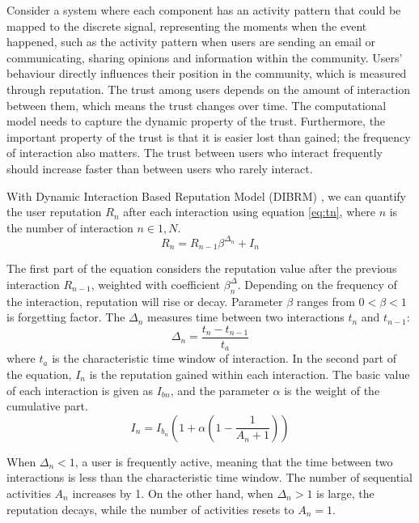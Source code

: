 Consider a system where each component has an activity pattern that could be mapped to the discrete signal, representing the moments when the event happened, such as the activity pattern when users are sending an email or communicating, sharing opinions and information within the community. Users' behaviour directly influences their position in the community, which is measured through reputation. The trust among users depends on the amount of interaction between them, which means the trust changes over time. The computational model needs to capture the dynamic property of the trust. Furthermore, the important property of the trust is that it is easier lost than gained; the frequency of interaction also matters. The trust between users who interact frequently should increase faster than between users who rarely interact. 

With Dynamic Interaction Based Reputation Model (DIBRM) \cite{melnikov2018toward}, we can quantify the user reputation $R_n$ after each interaction using equation \ref{eq:tn}, where $n$ is the number of interaction $n\in{1, N}$.
\begin{equation}\label{eq:tn}
R_{n}=R_{n-1} \beta^{\Delta_{n}} + I_{n}
\end{equation}

The first part of the equation considers the reputation value after the previous interaction $R_{n-1}$, weighted with coefficient $\beta^\Delta_{n}$. Depending on the frequency of the interaction, reputation will rise or decay. Parameter $\beta$ ranges from $0<\beta < 1$ is forgetting factor. The $\Delta_n$ measures time between two interactions $t_n$ and $t_{n-1}$: 
\begin{equation}\label{eq:deltan}
\Delta_{n}=\frac{t_{n}-t_{n-1}}{t_{a}}
\end{equation}
where $t_a$ is the characteristic time window of interaction. In the second part of the equation, $I_n$ is the reputation gained within each interaction. The basic value of each interaction is given as $I_{bn}$, and the parameter $\alpha$ is the weight of the cumulative part. 
\begin{equation}\label{eq:ibn}
I_n  = I_{b_{n}}(1 +  \alpha  (1-\frac{1}{A_n+1}))
\end{equation}

When $\Delta_{n}<1$, a user is frequently active, meaning that the time between two interactions is less than the characteristic time window. The number of sequential activities $A_n$ increases by 1. On the other hand, when $\Delta_n>1$ is large, the reputation decays, while the number of activities resets to $A_n=1$. 



